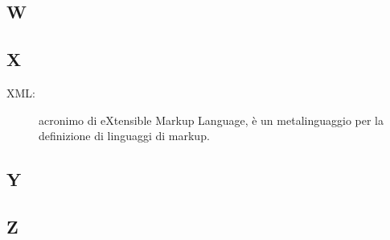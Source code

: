 \documentclass[../manuale-manutentore.tex]{subfiles}
\begin{document}
\subsection{W}

\subsection{X}
\begin{description}
    \item[XML:] acronimo di eXtensible Markup Language, è un metalinguaggio per la definizione di linguaggi di markup.
\end{description}

\subsection{Y}

\subsection{Z}
\end{document}
